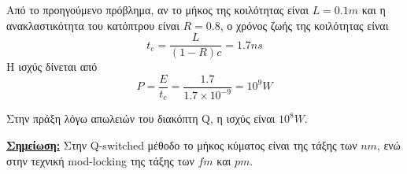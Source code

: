 \documentclass[a4paper,11pt,titlepage]{article}
\numberwithin{equation}{section} %
\begin{document}
Από το προηγούμενο πρόβλημα, αν το μήκος της κοιλότητας είναι $L=0.1m$ και η ανακλαστικότητα του κατόπτρου είναι $R=0.8$, ο χρόνος ζωής της κοιλότητας είναι 
\begin{equation*}
 t_c=\dfrac{L}{(1-R)c}=1.7ns
\end{equation*}
Η ισχύς δίνεται από 
\[
 P=\dfrac{E}{t_c}=\dfrac{1.7}{1.7\times10^{-9}}=10^9W
\]

Στην πράξη λόγω απωλειών του διακόπτη Q, η ισχύς είναι $10^8W$.

\textbf{\underline{Σημείωση:}}
Στην Q-switched μέθοδο το μήκος κύματος είναι της τάξης των $nm$, ενώ στην τεχνική mod-locking της τάξης των $fm$ και $pm$.
\end{document}
